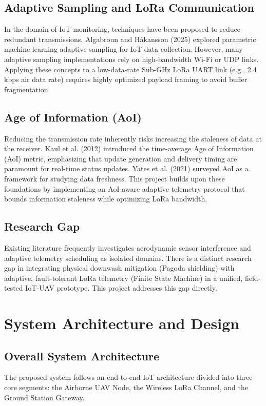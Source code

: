 \documentclass[11pt, a4paper]{article}
\begin{document}
\subsection{Adaptive Sampling and LoRa Communication}
In the domain of IoT monitoring, techniques have been proposed to reduce redundant transmissions. Algabroun and Håkansson (2025) explored parametric machine-learning adaptive sampling for IoT data collection. However, many adaptive sampling implementations rely on high-bandwidth Wi-Fi or UDP links. Applying these concepts to a low-data-rate Sub-GHz LoRa UART link (e.g., 2.4 kbps air data rate) requires highly optimized payload framing to avoid buffer fragmentation.

\subsection{Age of Information (AoI)}
Reducing the transmission rate inherently risks increasing the staleness of data at the receiver. Kaul et al. (2012) introduced the time-average Age of Information (AoI) metric, emphasizing that update generation and delivery timing are paramount for real-time status updates. Yates et al. (2021) surveyed AoI as a framework for studying data freshness. This project builds upon these foundations by implementing an AoI-aware adaptive telemetry protocol that bounds information staleness while optimizing LoRa bandwidth.

\subsection{Research Gap}
Existing literature frequently investigates aerodynamic sensor interference and adaptive telemetry scheduling as isolated domains. There is a distinct research gap in integrating physical downwash mitigation (Pagoda shielding) with adaptive, fault-tolerant LoRa telemetry (Finite State Machine) in a unified, field-tested IoT-UAV prototype. This project addresses this gap directly.

\section{System Architecture and Design}
\subsection{Overall System Architecture}
The proposed system follows an end-to-end IoT architecture divided into three core segments: the Airborne UAV Node, the Wireless LoRa Channel, and the Ground Station Gateway.
\end{document}
